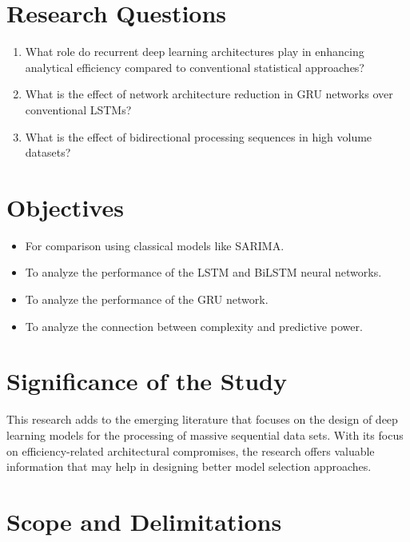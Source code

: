 \documentclass[12pt]{report}
\begin{document}
\section{Research Questions}

\begin{enumerate}
    \item What role do recurrent deep learning architectures play in enhancing analytical efficiency compared to conventional statistical approaches?
    
    \item What is the effect of network architecture reduction in GRU networks over conventional LSTMs?
    
    \item What is the effect of bidirectional processing sequences in high volume datasets?
\end{enumerate}

\section{Objectives}

\begin{itemize}
    \item For comparison using classical models like SARIMA.
    
    \item To analyze the performance of the LSTM and BiLSTM neural networks.
    
    \item To analyze the performance of the GRU network.
    
    \item To analyze the connection between complexity and predictive power.
\end{itemize}

\section{Significance of the Study}

This research adds to the emerging literature that focuses on the design of deep learning models for the processing of massive sequential data sets. With its focus on efficiency-related architectural compromises, the research offers valuable information that may help in designing better model selection approaches.


\section{Scope and Delimitations}
\end{document}
